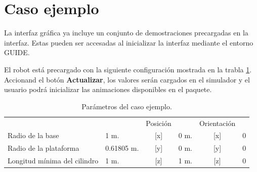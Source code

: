 \section{Caso ejemplo}
La interfaz gráfica ya incluye un conjunto de 
demostraciones precargadas en la interfaz. 
Estas pueden ser accesadas al inicializar la interfaz
mediante el entorno GUIDE.

El robot está precargado con la siguiente 
configuración mostrada en la trabla \ref{tab: example}.
Accionand el botón \textbf{Actualizar}, los valores 
serán cargados en el simulador y el usuario 
podrá inicializar las animaciones disponibles en el paquete.

\begin{table}[h]
\begin{center}
\begin{tabular}{llcccc}
 & & Posición & & Orientación & \\
Radio de la base & 1 m. &  [x] & 0 m. &  [x] & 0\\
Radio de la plataforma & 0.61805 m. &  [y] & 0 m. &  [y] & 0\\
Longitud mínima del cilindro & 1 m. &  [z] & 1 m. &  [z] & 0
\end{tabular}
\end{center}
\caption{Parámetros del caso ejemplo.}
\label{tab: example}
\end{table}






